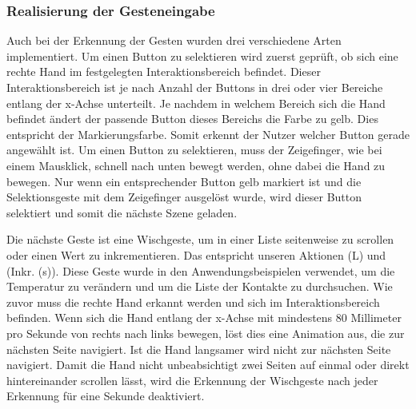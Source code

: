 \subsubsection[Geste]{Realisierung der Gesteneingabe}
Auch bei der Erkennung der Gesten wurden drei verschiedene Arten implementiert. 
Um einen Button zu selektieren wird zuerst geprüft, ob sich eine rechte Hand im festgelegten Interaktionsbereich befindet. 
Dieser Interaktionsbereich ist je nach Anzahl der Buttons in drei oder vier Bereiche entlang der x-Achse unterteilt. 
Je nachdem in welchem Bereich sich die Hand befindet ändert der passende Button dieses Bereichs die Farbe zu gelb.
Dies entspricht der Markierungsfarbe. 
Somit erkennt der Nutzer welcher Button gerade angewählt ist. 
Um einen Button zu selektieren, muss der Zeigefinger, wie bei einem Mausklick, schnell nach unten bewegt werden, ohne dabei die Hand zu bewegen. 
Nur wenn ein entsprechender Button gelb markiert ist und die Selektionsgeste mit dem Zeigefinger ausgelöst wurde, wird dieser Button selektiert und somit die nächste Szene geladen. 

Die nächste Geste ist eine Wischgeste, um in einer Liste seitenweise zu scrollen oder einen Wert zu inkrementieren.
Das entspricht unseren Aktionen (L) und (Inkr. (s)). 
Diese Geste wurde in den Anwendungsbeispielen verwendet, um die Temperatur zu verändern und um die Liste der Kontakte zu durchsuchen. 
Wie zuvor muss die rechte Hand erkannt werden und sich im Interaktionsbereich befinden. 
Wenn sich die Hand entlang der x-Achse mit mindestens 80 Millimeter pro Sekunde von rechts nach links bewegen, löst dies eine Animation aus, die zur nächsten Seite navigiert. Ist die Hand langsamer wird nicht zur nächsten Seite navigiert. 
Damit die Hand nicht unbeabsichtigt zwei Seiten auf einmal oder direkt hintereinander scrollen lässt, wird die Erkennung der Wischgeste nach jeder Erkennung für eine Sekunde deaktiviert. 

